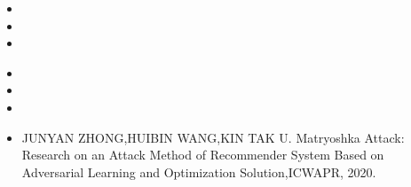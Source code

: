   \begin{itemize}[leftmargin=*]
    \item {}
    \item {}
    \item {}
    
  \end{itemize}
  \begin{itemize}[leftmargin=*]
    \item{}
    \item {}
    \item {}
     \item {JUNYAN ZHONG,HUIBIN WANG,KIN TAK U. Matryoshka Attack: Research on an Attack Method of Recommender System Based on Adversarial Learning and Optimization Solution,ICWAPR, 2020. } 
  \end{itemize}